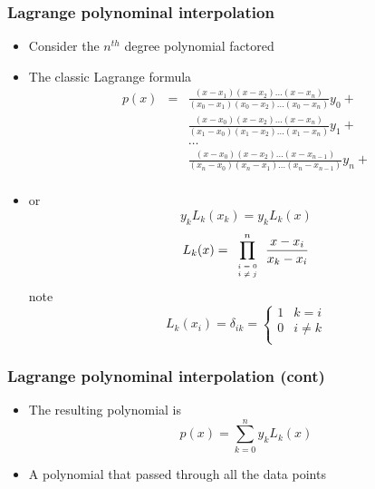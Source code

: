 \documentclass[10pt]{beamer}
\begin{document}
\begin{frame}
  \frametitle{Lagrange polynominal interpolation}
  \begin{itemize}
  \item Consider the $n^{th}$ degree polynomial factored
  \item The classic Lagrange formula
    \[
      \begin{array}{lll}
        p(x) & = & \frac{(x-x_1)(x-x_2) \ldots (x-x_n)}{(x_0-x_1)(x_0-x_2) \ldots (x_0-x_n)} y_0 +\\
             &   & \frac{(x-x_0)(x-x_2) \ldots (x-x_n)}{(x_1-x_0)(x_1-x_2) \ldots (x_1-x_n)} y_1 +\\
             &   & \ldots \\
             &   & \frac{(x-x_0)(x-x_2) \ldots (x-x_{n-1})}{(x_n-x_0)(x_n-x_1) \ldots (x_n-x_{n-1})} y_n +\\
      \end{array}
    \]
  \item or
    \[
      y_k L_k (x_k) = y_k L_k (x) 
    \]
    \[
      L_k (x) = \prod_{{\tiny
        \begin{array}{c}
          i = 0 \\ i \neq j\\
        \end{array}}}^n
      \frac{x-x_i}{x_k-x_i}
    \]
    note
    \[
      L_k (x_i) = \delta_{ik} = \left\{
        \begin{array}{cc}
          1 & k=i \\
          0 & i \neq k\\
        \end{array}
      \right.
    \]
  \end{itemize}
\end{frame}

\begin{frame}
  \frametitle{Lagrange polynominal interpolation (cont)}
  \begin{itemize}
  \item The resulting polynomial is
    \[
      p(x) = \sum_{k=0}^n y_k L_k(x)
    \]
  \item A polynomial that passed through all the data points
  \end{itemize}
\end{frame}
\end{document}
